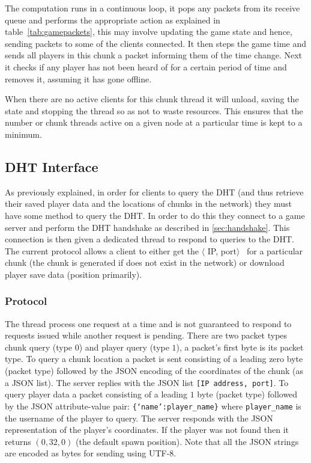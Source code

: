 \documentclass[12pt,notitlepage,a4paper]{report}
\begin{document}
	The computation runs in a continuous loop, it pops any packets from its receive queue and performs the appropriate action as explained in table~\ref{tab:gamepackets}, this may involve updating the game state and hence, sending packets to some of the clients connected. It then steps the game time and sends all players in this chunk a packet informing them of the time change. Next it checks if any player has not been heard of for a certain period of time and removes it, assuming it has gone offline.
	
	When there are no active clients for this chunk thread it will unload, saving the state and stopping the thread so as not to waste resources. This ensures that the number or chunk threads active on a given node at a particular time is kept to a minimum.
	
	\subsection{DHT Interface}
	\label{sec:interface}
	As previously explained, in order for clients to query the DHT (and thus retrieve their saved player data and the locations of chunks in the network) they must have some method to query the DHT. In order to do this they connect to a game server and perform the DHT handshake as described in \cref{sec:handshake}. This connection is then given a dedicated thread to respond to queries to the DHT. The current protocol allows a client to either get the $\langle$ IP, port$\rangle$~ for a particular chunk (the chunk is generated if does not exist in the network) or download player save data (position primarily).
	
	\subsubsection{Protocol}
	The thread process one request at a time and is not guaranteed to respond to requests issued while another request is pending. There are two packet types chunk query (type $0$) and player query (type $1$), a packet's first byte is its packet type. To query a chunk location a packet is sent consisting of a leading zero byte (packet type) followed by the JSON encoding of the coordinates of the chunk (as a JSON list). The server replies with the JSON list \texttt{[IP address, port]}. To query player data a packet consisting of a leading $1$ byte (packet type) followed by the JSON attribute-value pair: \texttt{\{`name':player\_name\}} where \texttt{player\_name} is the username of the player to query. The server responds with the JSON representation of the player's coordinates. If the player was not found then it returns $(0,32,0)$ (the default spawn position). Note that all the JSON strings are encoded as bytes for sending using UTF-8.
	
\end{document}
